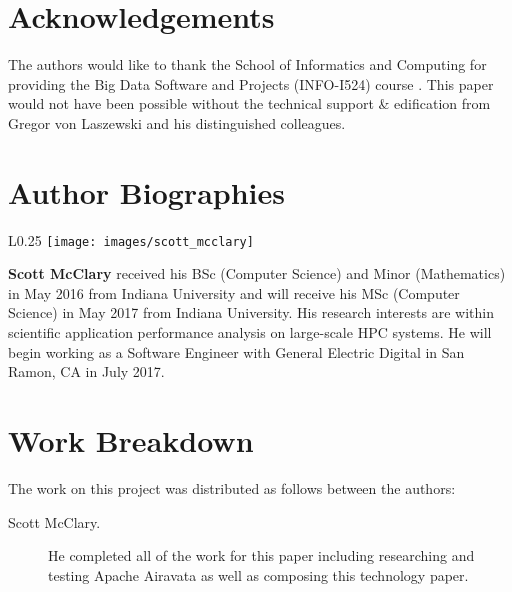 \documentclass[9pt,twocolumn,twoside]{styles/osajnl}
\begin{document}
\section*{Acknowledgements}
The authors would like to thank the School of Informatics and
Computing for providing the Big Data Software and Projects (INFO-I524)
course \cite{www-i524}. This paper would not have been possible
without the technical support \& edification from Gregor von Laszewski
and his distinguished colleagues.

 
\section*{Author Biographies}
\begingroup
\setlength\intextsep{0pt}
\begin{minipage}[t][3.2cm][t]{1.0\columnwidth} 
  \begin{wrapfigure}{L}{0.25\columnwidth}
    \texttt{[image: images/scott\_mcclary]}
  \end{wrapfigure}
  \noindent
  {\bfseries Scott McClary} received his BSc (Computer Science) and
  Minor (Mathematics) in May 2016 from Indiana University and will
  receive his MSc (Computer Science) in May 2017 from Indiana
  University. His research interests are within scientific application
  performance analysis on large-scale HPC systems. He will begin
  working as a Software Engineer with General Electric Digital in San
  Ramon, CA in July 2017.
\end{minipage}
\endgroup

\section*{} %
\section*{Work Breakdown}
The work on this project was distributed as follows between the
authors:
\begin{description}
\item[Scott McClary.] He completed all of the work for this paper
  including researching and testing Apache Airavata as well as
  composing this technology paper.
\end{description}


\end{document}
